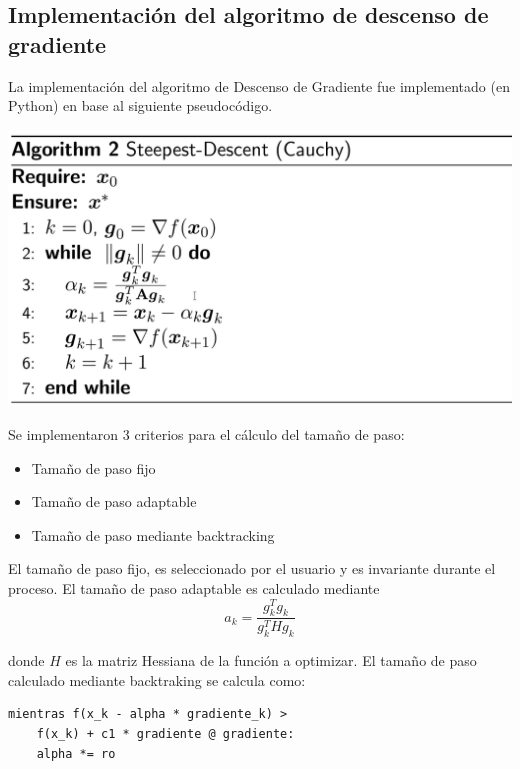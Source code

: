 \documentclass[journal]{IEEEtran}
\begin{document}
\subsection{Implementación del algoritmo de descenso de gradiente}

La implementación del algoritmo de Descenso de Gradiente fue implementado (en Python) en base al siguiente pseudocódigo.

    \centering
    \includegraphics[scale=0.28]{1.png}
    \label{k}

Se implementaron 3 criterios para el cálculo del tamaño de paso:

\begin{itemize}
    \item Tamaño de paso fijo
    \item Tamaño de paso adaptable
    \item Tamaño de paso mediante backtracking
\end{itemize}

El tamaño de paso fijo, es seleccionado por el usuario y es invariante durante el proceso. El tamaño de paso adaptable es calculado mediante
$$
a_k = \frac{g_k^T g_k}{g_k^T H g_k}
$$

donde $H$ es la matriz Hessiana de la función a optimizar. El tamaño de paso calculado mediante backtraking se calcula como:

\lstset{language=Python}
\lstset{frame=lines}
\lstset{basicstyle=\footnotesize}
\begin{lstlisting}
mientras f(x_k - alpha * gradiente_k) >
    f(x_k) + c1 * gradiente @ gradiente:
    alpha *= ro
\end{lstlisting}
\end{document}
